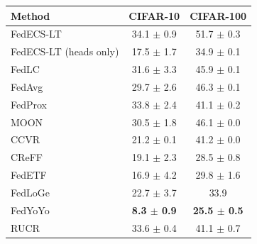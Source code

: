 \begin{tabular}{lcc}
\toprule
Method & CIFAR-10 & CIFAR-100\\
\midrule
FedECS-LT & 34.1 $\pm$ 0.9 & 51.7 $\pm$ 0.3\\
FedECS-LT (heads only) & 17.5 $\pm$ 1.7 & 34.9 $\pm$ 0.1\\
FedLC & 31.6 $\pm$ 3.3 & 45.9 $\pm$ 0.1\\
FedAvg & 29.7 $\pm$ 2.6 & 46.3 $\pm$ 0.1\\
FedProx & 33.8 $\pm$ 2.4 & 41.1 $\pm$ 0.2\\
MOON & 30.5 $\pm$ 1.8 & 46.1 $\pm$ 0.0\\
CCVR & 21.2 $\pm$ 0.1 & 41.2 $\pm$ 0.0\\
CReFF & 19.1 $\pm$ 2.3 & 28.5 $\pm$ 0.8\\
FedETF & 16.9 $\pm$ 4.2 & 29.8 $\pm$ 1.6\\
FedLoGe & 22.7 $\pm$ 3.7 & 33.9\\
FedYoYo & \textbf{8.3 $\pm$ 0.9} & \textbf{25.5 $\pm$ 0.5}\\
RUCR & 33.6 $\pm$ 0.4 & 41.1 $\pm$ 0.7\\
\bottomrule
\end{tabular}
